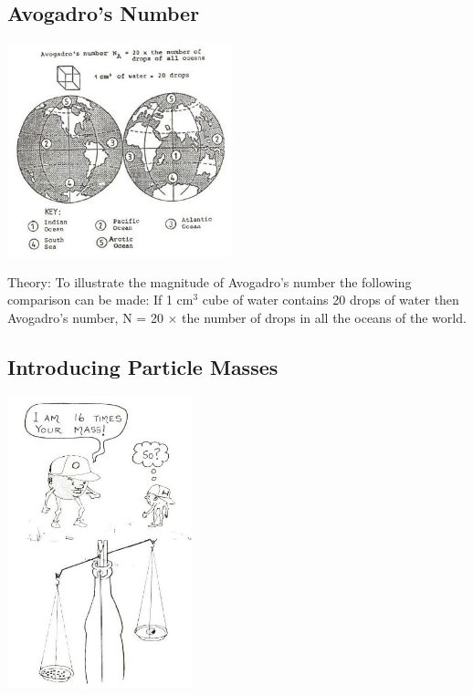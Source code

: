 \begin{multicols}{2}
\subsection{Avogadro's Number}

\begin{center}
\includegraphics[width=0.49\textwidth]{./img/source/avogadro.jpg}
\end{center}

\begin{description*}
\item[Theory:]{To illustrate the magnitude of Avogadro's
number the following comparison can be made:
If 1 cm$^3$ cube of water contains 20 drops of water
then Avogadro's number, N = 20 $\times$ the number of
drops in all the oceans of the world.}
\end{description*}

\subsection{Introducing Particle Masses}

\begin{center}
\includegraphics[width=0.4\textwidth]{./img/source/particle-mass.jpg}
\end{center}


\end{multicols}
